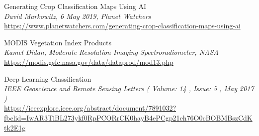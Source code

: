 \documentclass[12pt, openany]{report}
\begin{document}
\begin{thebibliography}{9}
Generating Crop Classification Maps Using AI\\
\textit{David Markowitz, 6 May 2019, Planet Watchers}\\
\url{https://www.planetwatchers.com/generating-crop-classification-maps-using-ai}

MODIS Vegetation Index Products\\
\textit{Kamel Didan, Moderate Resolution Imaging Spectroradiometer, NASA}\\
\url{https://modis.gsfc.nasa.gov/data/dataprod/mod13.php}

Deep Learning Classification\\
\textit{ IEEE Geoscience and Remote Sensing Letters ( Volume: 14 , Issue: 5 , May 2017 )}\\
\url{https://ieeexplore.ieee.org/abstract/document/7891032?fbclid=IwAR3TiBL273ykf0RpPCORrCK0hayB4ePCgp21eh76O0cBOBMBszCdKtk2E1g}





\end{thebibliography}
\end{document}
